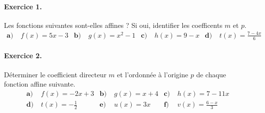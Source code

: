 \documentclass[11pt]{article}
\begin{document}

\paragraph{Exercice 1.} Les fonctions suivantes sont-elles affines ? Si oui,
identifier les coefficents $m$ et $p$.
\begin{align*}
  \textbf{a)}\;& f(x) = 5x-3 &
  \textbf{b)}\;& g(x) = x^2-1 &
  \textbf{c)}\;& h(x) = 9-x &
  \textbf{d)}\;& t(x) = \frac{7-4x}{6}
\end{align*}

\paragraph{Exercice 2.} Déterminer le coefficient directeur $m$ et l'ordonnée à
l'origine $p$ de chaque fonction affine suivante.
\begin{align*}
  \textbf{a)}\;& f(x) = -2x+3 &
  \textbf{b)}\;& g(x) = x+4 &
  \textbf{c)}\;& h(x) = 7-11x \\
  \textbf{d)}\;& t(x) = -\frac{1}{2} &
  \textbf{e)}\;& u(x) = 3x &
  \textbf{f)}\;& v(x) = \frac{6-x}{3}
\end{align*}
\end{document}
